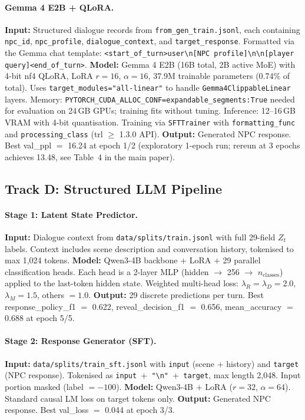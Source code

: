 \documentclass[11pt]{article}
\begin{document}
\paragraph{Gemma 4 E2B + QLoRA.}
\textbf{Input:} Structured dialogue records from \texttt{from\_gen\_train.jsonl}, each containing \texttt{npc\_id}, \texttt{npc\_profile}, \texttt{dialogue\_context}, and \texttt{target\_response}.
Formatted via the Gemma chat template: \texttt{<start\_of\_turn>user\textbackslash n[NPC profile]\textbackslash n\textbackslash n[player query]<end\_of\_turn>}.
\textbf{Model:} Gemma 4 E2B (16B total, 2B active MoE) with 4-bit nf4 QLoRA, LoRA $r=16$, $\alpha=16$, 37.9M trainable parameters (0.74\% of total).
Uses \texttt{target\_modules="all-linear"} to handle \texttt{Gemma4ClippableLinear} layers.
Memory: \texttt{PYTORCH\_CUDA\_ALLOC\_CONF=expandable\_segments:True} needed for evaluation on 24\,GB GPUs; training fits without tuning.
Inference: 12--16\,GB VRAM with 4-bit quantisation.
Training via \texttt{SFTTrainer} with \texttt{formatting\_func} and \texttt{processing\_class} (trl $\geq$ 1.3.0 API).
\textbf{Output:} Generated NPC response.
Best val\_ppl $=$ 16.24 at epoch 1/2 (exploratory 1-epoch run; rereun at 3 epochs achieves 13.48, see Table~4 in the main paper).

\subsection{Track D: Structured LLM Pipeline}

\paragraph{Stage 1: Latent State Predictor.}
\textbf{Input:} Dialogue context from \texttt{data/splits/train.jsonl} with full 29-field $Z_t$ labels.
Context includes scene description and conversation history, tokenised to max 1,024 tokens.
\textbf{Model:} Qwen3-4B backbone $+$ LoRA $+$ 29 parallel classification heads.
Each head is a 2-layer MLP (hidden $\rightarrow$ 256 $\rightarrow$ $n_\text{classes}$) applied to the last-token hidden state.
Weighted multi-head loss: $\lambda_R = \lambda_D = 2.0$, $\lambda_M = 1.5$, others $=1.0$.
\textbf{Output:} 29 discrete predictions per turn.
Best response\_policy\_f1 $=$ 0.622, reveal\_decision\_f1 $=$ 0.656, mean\_accuracy $=$ 0.688 at epoch 5/5.

\paragraph{Stage 2: Response Generator (SFT).}
\textbf{Input:} \texttt{data/splits/train\_sft.jsonl} with \texttt{input} (scene $+$ history) and \texttt{target} (NPC response).
Tokenised as \texttt{input $+$ "\textbackslash n" $+$ target}, max length 2,048.
Input portion masked (label $=-100$).
\textbf{Model:} Qwen3-4B $+$ LoRA ($r=32$, $\alpha=64$). Standard causal LM loss on target tokens only.
\textbf{Output:} Generated NPC response.
Best val\_loss $=$ 0.044 at epoch 3/3.
\end{document}
